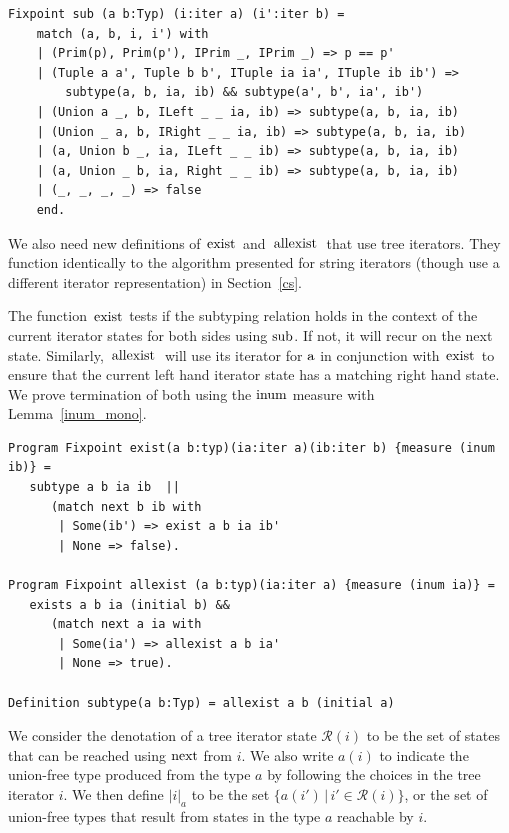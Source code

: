 \documentclass[a4paper,english]{lipics-v2019}
\renewcommand{\c}[1]{\ensuremath{\text{\lstinline{#1}}}\xspace}
\begin{document}
\begin{lstlisting}
Fixpoint sub (a b:Typ) (i:iter a) (i':iter b) =
    match (a, b, i, i') with
    | (Prim(p), Prim(p'), IPrim _, IPrim _) => p == p'
    | (Tuple a a', Tuple b b', ITuple ia ia', ITuple ib ib') =>
        subtype(a, b, ia, ib) && subtype(a', b', ia', ib')
    | (Union a _, b, ILeft _ _ ia, ib) => subtype(a, b, ia, ib)
    | (Union _ a, b, IRight _ _ ia, ib) => subtype(a, b, ia, ib)
    | (a, Union b _, ia, ILeft _ _ ib) => subtype(a, b, ia, ib)
    | (a, Union _ b, ia, Right _ _ ib) => subtype(a, b, ia, ib)
    | (_, _, _, _) => false
    end.
\end{lstlisting}

We also need new definitions of \c{exist} and \c{allexist} that use tree iterators. They
function identically to the algorithm presented for string iterators (though use a different
iterator representation) in Section~\ref{cs}.

The function \c{exist} tests if the subtyping relation holds in the context of
the current iterator states for both sides using \c{sub}. If not, it will
recur on the next state. Similarly, \c{allexist} will use its iterator for \c
a in conjunction with \c{exist} to ensure that the current left hand iterator
state has a matching right hand state. We prove termination of both using the
\c{inum} measure with Lemma~\ref{inum_mono}.

\begin{lstlisting}
Program Fixpoint exist(a b:typ)(ia:iter a)(ib:iter b) {measure (inum ib)} =
   subtype a b ia ib  || 
      (match next b ib with 
       | Some(ib') => exist a b ia ib' 
       | None => false).

Program Fixpoint allexist (a b:typ)(ia:iter a) {measure (inum ia)} =
   exists a b ia (initial b) && 
      (match next a ia with 
       | Some(ia') => allexist a b ia' 
       | None => true).

Definition subtype(a b:Typ) = allexist a b (initial a)
\end{lstlisting}

\newcommand{\irdn}[1]{\ensuremath{\mathcal{R}({#1})}}
\newcommand{\irch}[2]{\ensuremath{|#1|_{#2}}}

We consider the denotation of a tree iterator state $\irdn{i}$ to be the set
of states that can be reached using \c{next} from $i$. We also write $a(i)$
to indicate the union-free type produced from the type $a$ by following the
choices in the tree iterator $i$. We then define \irch{i}{a} to be the set
$\{a(i')\,|\,i'\in\irdn{i}\}$, or the set of union-free types that result
from states in the type $a$ reachable by $i$.
\end{document}
